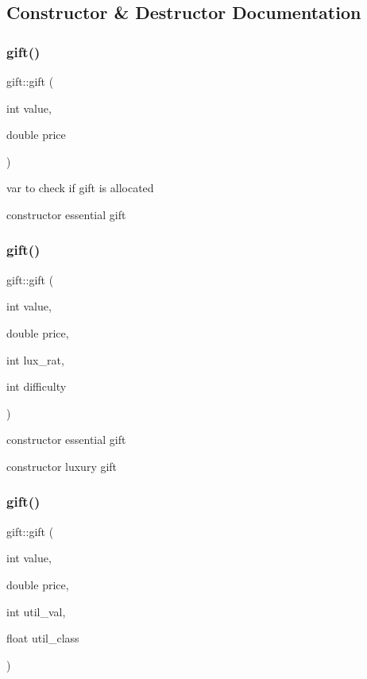 \subsection{Constructor \& Destructor Documentation}
\mbox{\label{classgift_a782f5cf6316f6c76061b72cc12c6d95c}} 
\subsubsection{\texorpdfstring{gift()}{gift()}\hspace{0.1cm}{\footnotesize\ttfamily [1/3]}}
{\footnotesize\ttfamily gift\+::gift (\begin{DoxyParamCaption}\item[{int}]{value,  }\item[{double}]{price }\end{DoxyParamCaption})}



var to check if gift is allocated 

constructor essential gift \mbox{\label{classgift_a1de4cec7237a45096900754354d1edb6}} 
\subsubsection{\texorpdfstring{gift()}{gift()}\hspace{0.1cm}{\footnotesize\ttfamily [2/3]}}
{\footnotesize\ttfamily gift\+::gift (\begin{DoxyParamCaption}\item[{int}]{value,  }\item[{double}]{price,  }\item[{int}]{lux\+\_\+rat,  }\item[{int}]{difficulty }\end{DoxyParamCaption})}



constructor essential gift 

constructor luxury gift \mbox{\label{classgift_ac62aba6ac2db2845c7b60a5496b6de75}} 
\subsubsection{\texorpdfstring{gift()}{gift()}\hspace{0.1cm}{\footnotesize\ttfamily [3/3]}}
{\footnotesize\ttfamily gift\+::gift (\begin{DoxyParamCaption}\item[{int}]{value,  }\item[{double}]{price,  }\item[{int}]{util\+\_\+val,  }\item[{float}]{util\+\_\+class }\end{DoxyParamCaption})}



